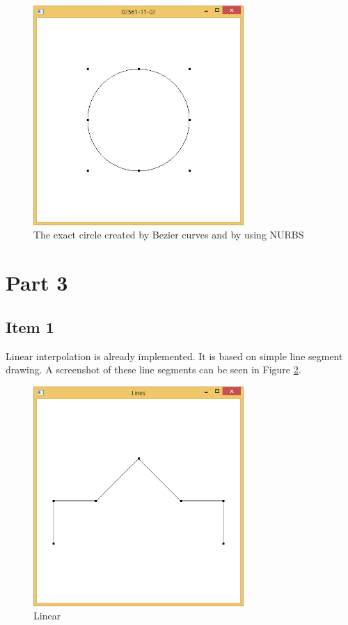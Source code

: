 \begin{figure}[hp]
\centering
\includegraphics[width=8cm]{../Screenshots/ex-11/2.png}
\caption{The exact circle created by Bezier curves and by using NURBS}
\label{fig:11-2}
\end{figure}

\section{Part 3}



\subsection{Item 1}

Linear interpolation is already implemented. It is based on simple line segment drawing. A screenshot of these line segments can be seen in Figure \ref{fig:11-3-1}.

\begin{figure}[hp]
\centering
\includegraphics[width=8cm]{../Screenshots/ex-11/3-1.png}
\caption{Linear}
\label{fig:11-3-1}
\end{figure}

